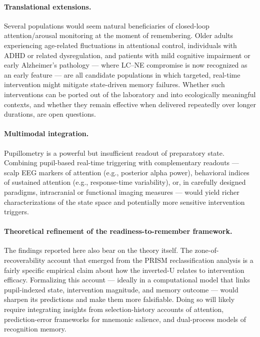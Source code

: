 \paragraph{Translational extensions.} Several populations would seem natural beneficiaries of closed-loop attention/arousal monitoring at the moment of remembering. Older adults experiencing age-related fluctuations in attentional control, individuals with ADHD or related dysregulation, and patients with mild cognitive impairment or early Alzheimer's pathology --- where LC--NE compromise is now recognized as an early feature \parencite{chalermpalanupap2013targeting} --- are all candidate populations in which targeted, real-time intervention might mitigate state-driven memory failures. Whether such interventions can be ported out of the laboratory and into ecologically meaningful contexts, and whether they remain effective when delivered repeatedly over longer durations, are open questions.

\paragraph{Multimodal integration.} Pupillometry is a powerful but insufficient readout of preparatory state. Combining pupil-based real-time triggering with complementary readouts --- scalp EEG markers of attention (e.g., posterior alpha power), behavioral indices of sustained attention (e.g., response-time variability), or, in carefully designed paradigms, intracranial or functional imaging measures --- would yield richer characterizations of the state space and potentially more sensitive intervention triggers.

\paragraph{Theoretical refinement of the readiness-to-remember framework.} The findings reported here also bear on the theory itself. The zone-of-recoverability account that emerged from the PRISM reclassification analysis is a fairly specific empirical claim about how the inverted-U relates to intervention efficacy. Formalizing this account --- ideally in a computational model that links pupil-indexed state, intervention magnitude, and memory outcome --- would sharpen its predictions and make them more falsifiable. Doing so will likely require integrating insights from selection-history accounts of attention, prediction-error frameworks for mnemonic salience, and dual-process models of recognition memory.

